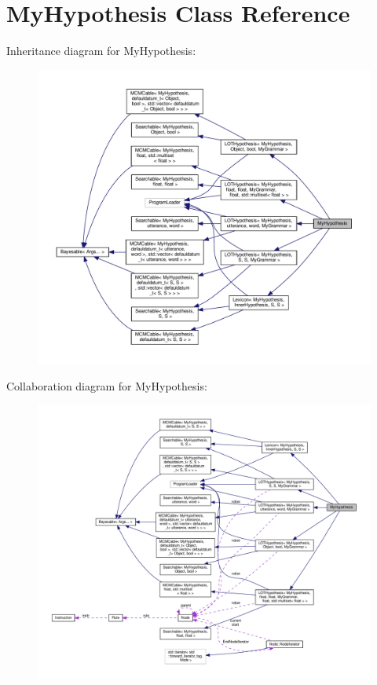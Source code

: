 \hypertarget{class_my_hypothesis}{}\section{My\+Hypothesis Class Reference}
\label{class_my_hypothesis}


Inheritance diagram for My\+Hypothesis\+:
\nopagebreak
\begin{figure}[H]
\begin{center}
\leavevmode
\includegraphics[width=350pt]{class_my_hypothesis__inherit__graph}
\end{center}
\end{figure}


Collaboration diagram for My\+Hypothesis\+:
\nopagebreak
\begin{figure}[H]
\begin{center}
\leavevmode
\includegraphics[width=350pt]{class_my_hypothesis__coll__graph}
\end{center}
\end{figure}
